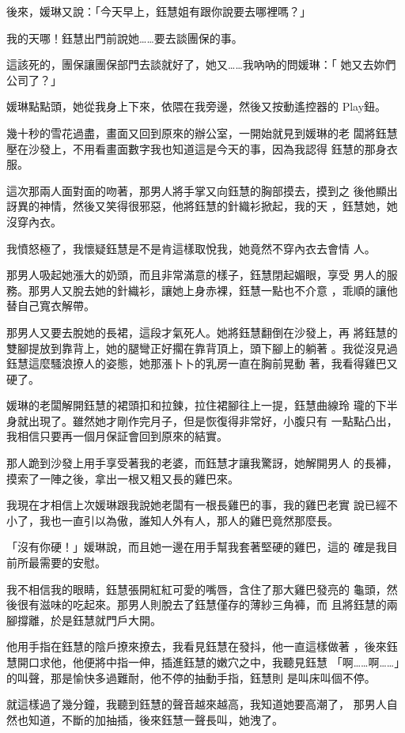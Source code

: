 後來，媛琳又說：「今天早上，鈺慧姐有跟你說要去哪裡嗎？」

我的天哪！鈺慧出門前說她……要去談團保的事。

這該死的，團保讓團保部門去談就好了，她又……我吶吶的問媛琳：「
她又去妳們公司了？」

媛琳點點頭，她從我身上下來，依隈在我旁邊，然後又按動遙控器的
Play鈕。

幾十秒的雪花過盡，畫面又回到原來的辦公室，一開始就見到媛琳的老
闆將鈺慧壓在沙發上，不用看畫面數字我也知道這是今天的事，因為我認得
鈺慧的那身衣服。

這次那兩人面對面的吻著，那男人將手掌又向鈺慧的胸部摸去，摸到之
後他顯出訝異的神情，然後又笑得很邪惡，他將鈺慧的針織衫掀起，我的天
，鈺慧她，她沒穿內衣。

我憤怒極了，我懷疑鈺慧是不是肯這樣取悅我，她竟然不穿內衣去會情
人。

那男人吸起她漲大的奶頭，而且非常滿意的樣子，鈺慧閉起媚眼，享受
男人的服務。那男人又脫去她的針織衫，讓她上身赤裸，鈺慧一點也不介意
，乖順的讓他替自己寬衣解帶。

那男人又要去脫她的長裙，這段才氣死人。她將鈺慧翻倒在沙發上，再
將鈺慧的雙腳提放到靠背上，她的腿彎正好擱在靠背頂上，頭下腳上的躺著
。我從沒見過鈺慧這麼騷浪撩人的姿態，她那漲卜卜的乳房一直在胸前晃動
著，我看得雞巴又硬了。

媛琳的老闆解開鈺慧的裙頭扣和拉鍊，拉住裙腳往上一提，鈺慧曲線玲
瓏的下半身就出現了。雖然她才剛作完月子，但是恢復得非常好，小腹只有
一點點凸出，我相信只要再一個月保証會回到原來的結實。

那人跪到沙發上用手享受著我的老婆，而鈺慧才讓我驚訝，她解開男人
的長褲，摸索了一陣之後，拿出一根又粗又長的雞巴來。

我現在才相信上次媛琳跟我說她老闆有一根長雞巴的事，我的雞巴老實
說已經不小了，我也一直引以為傲，誰知人外有人，那人的雞巴竟然那麼長。

「沒有你硬！」媛琳說，而且她一邊在用手幫我套著堅硬的雞巴，這的
確是我目前所最需要的安慰。

我不相信我的眼睛，鈺慧張開紅紅可愛的嘴唇，含住了那大雞巴發亮的
龜頭，然後很有滋味的吃起來。那男人則脫去了鈺慧僅存的薄紗三角褲，而
且將鈺慧的兩腳撐離，於是鈺慧就門戶大開。

他用手指在鈺慧的陰戶撩來撩去，我看見鈺慧在發抖，他一直這樣做著
，後來鈺慧開口求他，他便將中指一伸，插進鈺慧的嫩穴之中，我聽見鈺慧
「啊……啊……」的叫聲，那是愉快多過難耐，他不停的抽動手指，鈺慧則
是叫床叫個不停。

就這樣過了幾分鐘，我聽到鈺慧的聲音越來越高，我知道她要高潮了，
那男人自然也知道，不斷的加抽插，後來鈺慧一聲長叫，她洩了。

